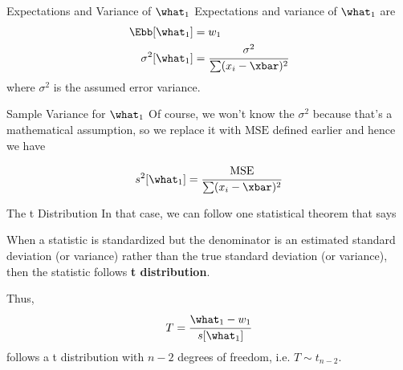 \documentclass[aspectratio=169,xcolor=dvipsnames,svgnames,x11names,fleqn]{beamer}
\begin{document}
    \begin{frame}{Expectations and Variance of $\what_1$}
    Expectations and variance of $\what_1$ are
    \begin{equation}
    \begin{aligned}
        \Ebb[\what_1] & = w_1\\
        \sigma^2[\what_1] & = \cfrac{\sigma^2}{\sum (x_i - \xbar)^2}
    \end{aligned}
    \end{equation}
    where $\sigma^2$ is the assumed error variance.
    \end{frame}
    
    \begin{frame}{Sample Variance for $\what_1$}
    Of course, we won't know the $\sigma^2$ because that's a mathematical assumption, so we replace it with $\textrm{MSE}$ defined earlier and hence we have 
    
    \begin{equation}
        s^2[\what_1] = \cfrac{\textrm{MSE}}{\sum (x_i - \xbar)^2}
    \end{equation}
    \end{frame}
    
    \begin{frame}{The t Distribution}
    In that case, we can follow one statistical theorem that says
    
    \begin{gradblock}{}
         When a statistic is standardized but the denominator is an estimated standard deviation (or variance) rather than the true standard deviation (or variance), then the statistic follows \textbf{t distribution}.
    \end{gradblock}
    
    Thus, 
    \begin{equation}
        T = \cfrac{\what_1 - w_1}{s[\what_1]}
    \end{equation}
    follows a t distribution with $n-2$ degrees of freedom, i.e. $T\sim t_{n-2}$.
    \end{frame}
    
\end{document}
